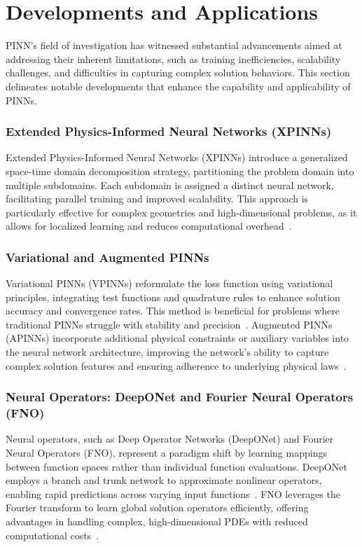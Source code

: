 \documentclass[12pt]{report} %
\theoremstyle{plain}           %
\theoremstyle{definition}      %
\theoremstyle{remark}          %
\begin{document}
\section{Developments and Applications}
PINN's field of investigation has witnessed substantial advancements aimed at addressing 
their inherent limitations, such as training inefficiencies, scalability challenges, 
and difficulties in capturing complex solution behaviors. This section delineates notable 
developments that enhance the capability and applicability of PINNs.

\subsubsection{Extended Physics-Informed Neural Networks (XPINNs)}
Extended Physics-Informed Neural Networks (XPINNs) introduce a generalized space-time domain 
decomposition strategy, partitioning the problem domain into multiple subdomains. 
Each subdomain is assigned a distinct neural network, facilitating parallel training 
and improved scalability. This approach is particularly effective for complex geometries 
and high-dimensional problems, as it allows for localized learning and reduces computational 
overhead~\cite{jagtap2020extended}.

\subsubsection{Variational and Augmented PINNs}
Variational PINNs (VPINNs) reformulate the loss function using variational principles, 
integrating test functions and quadrature rules to enhance solution accuracy and convergence 
rates. This method is beneficial for problems where traditional PINNs struggle with stability 
and precision~\cite{kharazmi2021hp}. Augmented PINNs (APINNs) incorporate additional physical 
constraints or auxiliary variables into the neural network architecture, improving the network's 
ability to capture complex solution features and ensuring adherence to 
underlying physical laws~\cite{patel2023turbulence}.

\subsubsection{Neural Operators: DeepONet and Fourier Neural Operators (FNO)}
Neural operators, such as Deep Operator Networks (DeepONet) and Fourier Neural 
Operators (FNO), represent a paradigm shift by learning mappings between function 
spaces rather than individual function evaluations. DeepONet employs a branch and 
trunk network to approximate nonlinear operators, enabling rapid predictions 
across varying input functions~\cite{lu2021learning}. FNO leverages the Fourier 
transform to learn global solution operators efficiently, offering advantages in 
handling complex, high-dimensional PDEs with reduced computational costs~\cite{li2020fourier}.
\end{document}
